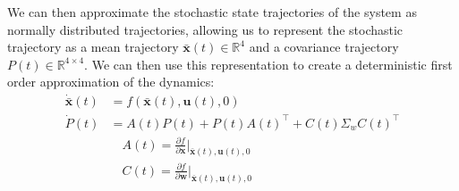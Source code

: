 \documentclass[letterpaper, 10pt, conference]{ieeeconf}
\begin{document}
We can then approximate the stochastic state trajectories of the system as normally distributed trajectories, allowing us to represent the stochastic trajectory as a mean trajectory $\mathbf{\bar{x}}(t) \in \mathbb{R}^4$ and a covariance trajectory $P(t) \in \mathbb{R}^{4\times 4}$. We can then use this representation to create a deterministic first order approximation of the dynamics: 
\begin{align*}
    \mathbf{\dot{\bar{x}}}(t) &= f(\mathbf{\bar{x}}(t), \mathbf{u}(t), 0) \\
    \dot{P}(t) &= A(t)P(t) + P(t)A(t)^\top + C(t) \Sigma_w C(t)^\top \\
    &\quad A(t) = \frac{\partial f}{\partial \mathbf{x}}\bigg|_{\mathbf{\bar{x}}(t), \mathbf{u}(t), 0} \\
    &\quad C(t) = \frac{\partial f}{\partial \mathbf{w}}\bigg|_{\mathbf{\bar{x}}(t), \mathbf{u}(t), 0}
\end{align*}
\end{document}
